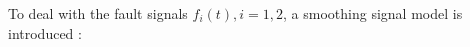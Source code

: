\documentclass{ieeeaccess}
\newtheorem{assumption}{Assumption}[section]
\begin{document}
To deal with the fault signals $f_i(t),i=1,2$, a smoothing signal model is introduced \cite{9306757}:
%
\end{document}
